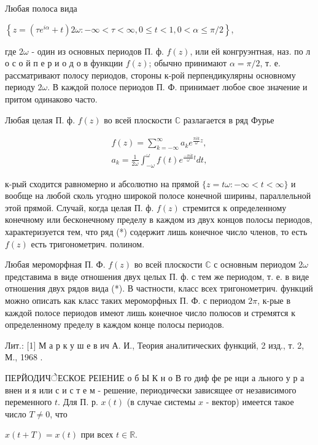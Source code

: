 \documentclass[10pt]{article}
\begin{document}
Любая полоса вида

$\left\{z=\left(\tau e^{i \alpha}+t\right) 2 \omega:-\infty<\tau<\infty, 0 \leqslant t<1,0<\alpha \leqslant \pi / 2\right\}$,

где $2 \omega$ - один из основных периодов П. ф. $f(z)$, или ей конгруэнтная, наз. по л о с о й п е р и о д о в функции $f(z)$; обычно принимают $\alpha=\pi / 2$, т. е. рассматривают полосу периодов, стороны к-рой перпендикулярны основному периоду $2 \omega$. В каждой полосе периодов П. Ф. принимает любое свое значение и притом одинаково часто.

Любая целая П. ф. $f(z)$ во всей плоскости $\mathbb{C}$ разлагается в ряд Фурье

\[
\begin{gathered}
f(z)=\sum_{k=-\infty}^{\infty} a_{k} e^{\frac{\pi i k}{\omega} z}, \\
a_{k}=\frac{1}{2 \omega} \int_{-\omega}^{\omega} f(t) e^{\frac{-\pi i k}{\omega} t} d t,
\end{gathered}
\]

к-рый сходится равномерно и абсолютно на прямой $\{z=t \omega:-\infty<t<\infty\}$ и вообще на любой сколь угодно широкой полосе конечной ширины, параллельной этой прямой. Случай, когда целая П. ф. $f(z)$ стремится к определенному конечному или бесконечному пределу в каждом из двух концов полосы периодов, характеризуется тем, что ряд (*) содержит лишь конечное число членов, то есть $f(z)$ есть тригонометрич. полином.

Любая мероморфная П. Ф. $f(z)$ во всей плоскости $\mathbb{C}$ с основным периодом $2 \omega$ представима в виде отношения двух целых П. ф. с тем же периодом, т. е. в виде отношения двух рядов вида (*). В частности, класс всех тригонометрич. функций можно описать как класс таких мероморфных П. Ф. с периодом $2 \pi$, к-рые в каждой полосе периодов имеют лишь конечное число полюсов и стремятся к определенному пределу в каждом конце полосы периодов.

Лит.: [1] М а р к у ш е в ич А. И., Теория аналитических функций, 2 изд., т. 2, М., 1968 .

ПЕРЙОДИЧेЕСКОЕ РЕIЕНИЕ о б Ы К н о В го диф фе ре нци а льного у р а внен и я или с и с т е м - решение, периодически зависящее от независимого переменного $t$. Для П. р. $x(t)$ (в случае системы $x$ - вектор) имеется такое число $T \neq 0$, что

$x(t+T)=x(t)$ при всех $t \in \mathbb{R}$.
\end{document}
